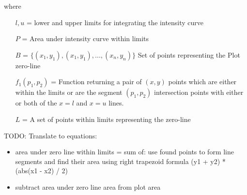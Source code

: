 where
\begin{itemize}
    \item [\(l, u\)  =] lower and upper limits for integrating the intensity curve
    \item [\(P\)  =] Area under intensity curve within limits
    \item [\(B\)  =] \(\lbrace (x_{1},y_{1}), (x_{1},y_{1}) , ... , (x_{n},y_{n}) \rbrace\) Set of points representing the Plot zero-line
    \item [\(f_{1}(p_{1}, p_{2})\)  =] Function returning a pair of \((x,y)\) points which are either within the limits or are the segment \((p_{1}, p_{2})\) intersection points with either or both of the \(x=l\) and \(x=u\) lines.
    \item [\(L\)  =] A set of points within limits representing the zero-line
\end{itemize}

TODO: Translate to equations:
\begin{itemize}
    \item area under zero line within limits = sum of: use found points to form line segments and find their area using right trapezoid formula (y1 + y2) * (abs(x1 - x2) / 2)
    \item subtract area under zero line area from plot area
\end{itemize}